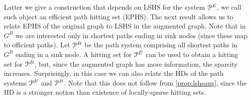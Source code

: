 

Latter we give a construction that depends on LSHS for the system $\mathcal{P}^E$, we call such object an efficient path hitting set (EPHS).
The next result allows us to relate EPHS of the original graph to LSHS in the augmented graph.
Note that in $G^B$ we are interested only in shortest paths ending in sink nodes (since these map to efficient paths). 
Let $\mathcal{P}^B$ be the path system comprising all shortest paths in $G^B$ ending in a sink node.
A hitting set for $\mathcal{P}^E$ can be used to obtain a hitting set for $\mathcal{P}^B$, but, since the augmented graph has more information, the sparsity increases.
Surprisingly, in this case we can also relate the HDs of the path systems $\mathcal{P}^E$ and $\mathcal{P}^B$.
Note that this does not follow from \cref{prop:lshsaug}, since the HD is a stronger notion than existence of locally-sparse hitting sets.
 

